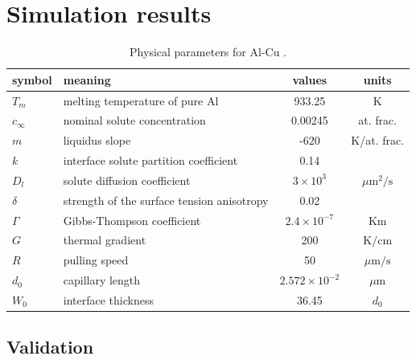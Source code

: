 \documentclass[a4paper,12pt]{article}
\begin{document}
\section{Simulation results}

\begin{table}
\centering
\caption{Physical parameters for Al-Cu \cite{Takaki2014}.}
\begin{tabular}{l l c c }
\toprule
symbol & meaning & values & units \\
\midrule
$T_m$ & melting temperature of pure Al & 933.25  & K \\
$c_{\infty}$ & nominal solute concentration &  0.00245 & at. frac. \\
$m$ &liquidus slope &  -620 & K/at. frac. \\
$k$ & interface solute partition coefficient & 0.14 &\\
$D_l$ & solute diffusion coefficient &  $3\times 10^{3}$  & ${\mu\text{m}}^2/\text{s}$ \\
$\delta$ & strength of the surface tension anisotropy  &  0.02  &\\
$\Gamma$ & Gibbs-Thompson coefficient & $2.4\times 10^{-7}$ & Km \\
$G$ & thermal gradient & 200 & $\text{K} / \text{cm}$ \\
$R$ & pulling speed &  50 & $\mu \text{m} / \text{s}$ \\
$d_0$ & capillary length & $ 2.572\times10^{-2}$  & $\mu$m \\
$W_0$ & interface thickness  & 36.45 & $d_0$ \\
\bottomrule
\end{tabular}\label{tab:Takaki}

\end{table}

\subsection{Validation}
\end{document}
